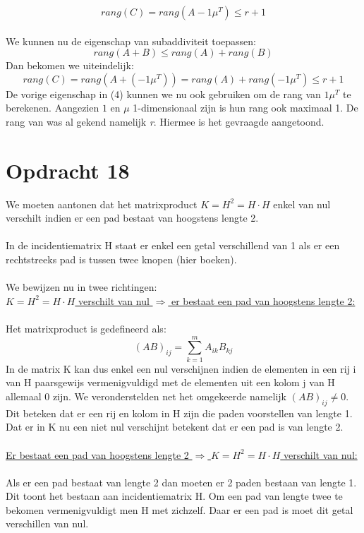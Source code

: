 \documentclass[11pt,a4paper]{article}
\begin{document}
$$ rang(C) = rang\left(A-1\mu^T\right) \leq r + 1$$
\\
We kunnen nu de eigenschap van subaddiviteit toepassen:
\begin{equation}
rang(A+B) \leq rang(A) + rang(B)
\end{equation} 
Dan bekomen we uiteindelijk:
$$  rang(C) = rang\left(A+(-1\mu^T)\right) = rang(A) + rang(-1\mu^T) \leq r + 1$$
De vorige eigenschap in (4) kunnen we nu ook gebruiken om de rang van $1\mu^T$ te berekenen. Aangezien $1$ en $\mu$ 1-dimensionaal zijn is hun rang ook maximaal 1. De rang van was al gekend namelijk \textit{r}. Hiermee is het gevraagde aangetoond.

\section*{Opdracht 18}

We moeten aantonen dat het matrixproduct $K = H^2 = H\cdot H$ enkel van nul verschilt indien er een pad bestaat van hoogstens lengte 2.
\\
\\
In de incidentiematrix H staat er enkel een getal verschillend van 1 als er een rechtstreeks pad is tussen twee knopen (hier boeken).
\\
\\
We bewijzen nu in twee richtingen:\\
\underline{$K = H^2 = H\cdot H$ verschilt van nul $\Rightarrow$ er bestaat een pad van hoogstens lengte 2:}
\\
\\
Het matrixproduct is gedefineerd als:
$$(AB)_{ij} = \sum_{k=1}^mA_{ik}B_{kj}$$
In de matrix K kan dus enkel een nul verschijnen indien de elementen in een rij i van H paarsgewijs vermenigvuldigd met de elementen uit een kolom j van H allemaal 0 zijn. We veronderstelden net het omgekeerde namelijk $(AB)_{ij} \neq 0$. Dit beteken dat er een rij en kolom in H zijn die paden voorstellen van lengte 1. Dat er in K nu een niet nul verschijnt betekent dat er een pad is van lengte 2.
\\
\\
\underline{Er bestaat een pad van hoogstens lengte 2 $\Rightarrow$ $K = H^2 = H\cdot H$ verschilt van nul:}
\\
\\
Als er een pad bestaat van lengte 2 dan moeten er 2 paden bestaan van lengte 1. Dit toont het bestaan aan incidentiematrix H. Om een pad van lengte twee te bekomen vermenigvuldigt men H met zichzelf. Daar er een pad is moet dit getal verschillen van nul.
\end{document}

